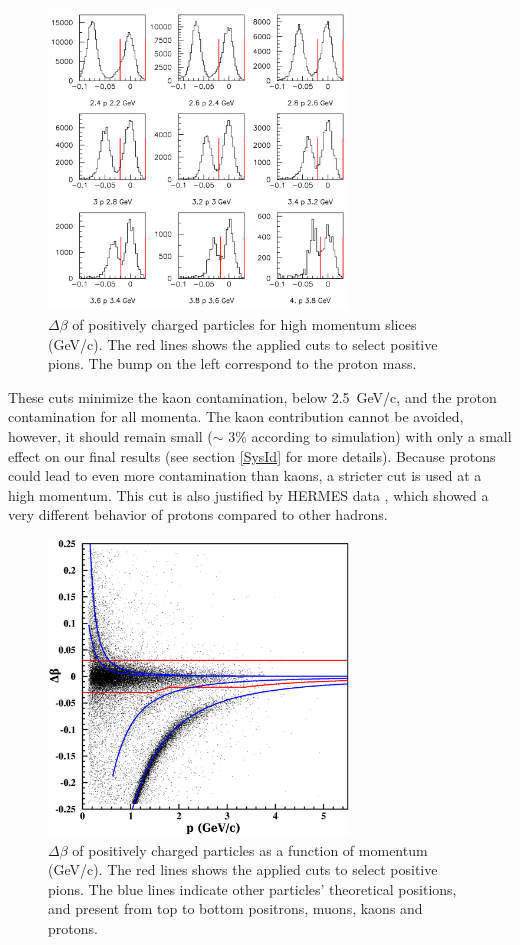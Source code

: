 \begin{figure}[tbp]
\centering
\includegraphics[width=8cm] {answer-fig/TofProfile3.png} 
\caption {$\Delta \beta$ of positively charged particles for high momentum slices 
(GeV/c). The red lines shows the applied cuts to select positive pions. The bump on the left
correspond to the proton mass.}
\label{TOF-3}
\end{figure}

These cuts minimize the kaon contamination, below 2.5~GeV/c, and the 
proton contamination for all momenta. The kaon contribution cannot be avoided, however, it should remain small ($\sim$ 3\% according to simulation) 
with only a small effect on our final results (see section \ref{SysId} 
for more details). Because protons could lead to even more contamination than kaons, 
a stricter cut is used at a high momentum. This cut is also justified by 
HERMES data \cite{Airapetian:2007vu}, which showed a very different behavior of protons compared to other hadrons.

\begin{figure}[tbp]
\centering
\includegraphics[width=8cm] {chap5-fig/pip_data.png} 
\caption {$\Delta \beta$ of positively charged particles as a function of momentum (GeV/c). The red lines shows the applied cuts to select positive pions. The blue lines indicate other particles' theoretical positions, and present from top to 
bottom positrons, muons, kaons and protons.}
\label{PipTOF}
\end{figure}

